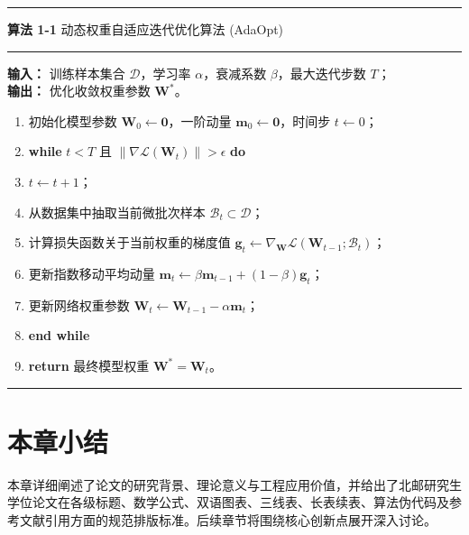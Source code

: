 \begin{table}[htbp]
  \centering
  \begin{minipage}{0.9\textwidth}
    \rule{\linewidth}{1.0pt}\vspace{3pt}
    \noindent\textbf{算法 1-1} \quad 动态权重自适应迭代优化算法 (AdaOpt)\\[-6pt]
    \rule{\linewidth}{0.5pt}\vspace{4pt}
    \textbf{输入：} 训练样本集合 $\mathcal{D}$，学习率 $\alpha$，衰减系数 $\beta$，最大迭代步数 $T$；\\
    \textbf{输出：} 优化收敛权重参数 $\mathbf{W}^*$。
    \begin{enumerate}[leftmargin=2.0em, itemsep=2pt, topsep=2pt]
      \item[1:] 初始化模型参数 $\mathbf{W}_0 \leftarrow \mathbf{0}$，一阶动量 $\mathbf{m}_0 \leftarrow \mathbf{0}$，时间步 $t \leftarrow 0$；
      \item[2:] \textbf{while} $t < T$ 且 $\|\nabla \mathcal{L}(\mathbf{W}_t)\| > \epsilon$ \textbf{do}
      \item[3:] \quad $t \leftarrow t + 1$；
      \item[4:] \quad 从数据集中抽取当前微批次样本 $\mathcal{B}_t \subset \mathcal{D}$；
      \item[5:] \quad 计算损失函数关于当前权重的梯度值 $\mathbf{g}_t \leftarrow \nabla_{\mathbf{W}} \mathcal{L}(\mathbf{W}_{t-1}; \mathcal{B}_t)$；
      \item[6:] \quad 更新指数移动平均动量 $\mathbf{m}_t \leftarrow \beta \mathbf{m}_{t-1} + (1 - \beta) \mathbf{g}_t$；
      \item[7:] \quad 更新网络权重参数 $\mathbf{W}_t \leftarrow \mathbf{W}_{t-1} - \alpha \mathbf{m}_t$；
      \item[8:] \textbf{end while}
      \item[9:] \textbf{return} 最终模型权重 $\mathbf{W}^* = \mathbf{W}_t$。
    \end{enumerate}
    \rule{\linewidth}{1.0pt}
  \end{minipage}
\end{table}

\section{本章小结}

本章详细阐述了论文的研究背景、理论意义与工程应用价值，并给出了北邮研究生学位论文在各级标题、数学公式、双语图表、三线表、长表续表、算法伪代码及参考文献引用方面的规范排版标准。后续章节将围绕核心创新点展开深入讨论。
